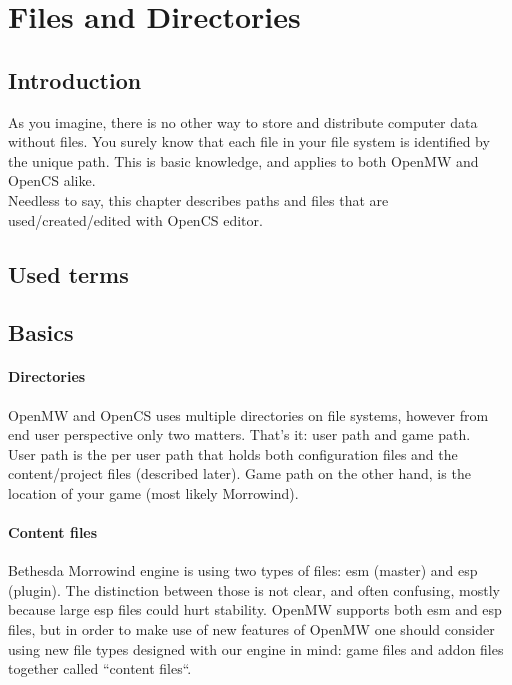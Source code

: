 \section{Files and Directories}
\subsection{Introduction}
As you imagine, there is no other way to store and distribute computer data without files. You surely know that each file in your file system is identified by the unique path. This is basic knowledge, and applies to both Open{MW} and Open{CS} alike.\\

Needless to say, this chapter describes paths and files that are used/created/edited with OpenCS editor.\\

\subsection{Used terms} %

\subsection{Basics}

\paragraph{Directories}
Open{MW} and Open{CS} uses multiple directories on file systems, however from end user perspective only two matters. That's it: user path and game path.\\

User path is the per user path that holds both configuration files and the content/project files (described later). Game path on the other hand, is the location of your game (most likely Morrowind\texttrademark).


\paragraph{Content files}
Bethesda Morrowind engine is using two types of files: esm (master) and esp (plugin). The distinction between those is not clear, and often confusing, mostly because large esp files could hurt stability. Open{MW} supports both esm and esp files, but in order to make use of new features of OpenMW one should consider using new file types designed with our engine in mind: game files and addon files together called ``content files``.\\

